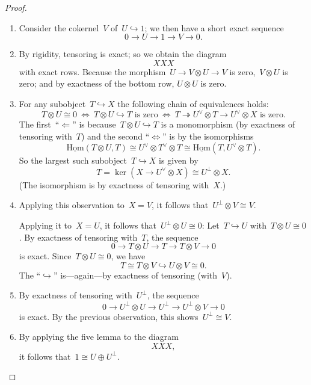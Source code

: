 \documentclass[a4paper,english,12pt]{scrartcl}
\theoremstyle{definition}
\theoremstyle{plain}
\theoremstyle{remark}
\renewcommand{\_}{\mathpunct{.}\,}
\newcommand{\?}{\,{:}\,}
\newcommand{\Hom}{\underline{\mathrm{Hom}}}
\begin{document}
\begin{proof}\begin{enumerate}
\item Consider the cokernel~$V$ of~$U \hookrightarrow 1$; we then have a short
exact sequence
\[ 0 \longrightarrow U \longrightarrow 1 \longrightarrow V \longrightarrow 0.
\]
\item By rigidity, tensoring is exact; so we obtain the diagram
\[ XXX \]
with exact rows. Because the morphism~$U \to V \otimes U \to V$ is zero,~$V
\otimes U$ is zero; and by exactness of the bottom row, $U \otimes U$ is zero.
\item For any subobject~$T \hookrightarrow X$ the following chain of
equivalences holds:
\[ T \otimes U \cong 0
  \ \Longleftrightarrow\ 
  \text{$T \otimes U \hookrightarrow T$ is zero}
  \ \Longleftrightarrow\ 
  \text{$T \twoheadrightarrow U^\vee \otimes T \to U^\vee \otimes X$ is zero}.
  \]
The first~``$\Leftarrow$'' is because~$T \otimes U \hookrightarrow T$ is a
monomorphism (by exactness of tensoring with~$T$) and the second
``$\Leftrightarrow$'' is by the isomorphisms
\[ \Hom(T \otimes U, T) \cong U^\vee \otimes T^\vee \otimes T \cong
  \Hom(T, U^\vee \otimes T). \]
So the largest such subobject~$T \hookrightarrow X$ is given by
\[ T = \ker(X \to U^\vee \otimes X) \cong U^\perp \otimes X. \]
(The isomorphism is by exactness of tensoring with~$X$.)
\item Applying this observation to~$X = V$, it follows that~$U^\perp \otimes V
\cong V$.

Applying it to~$X = U$, it follows that~$U^\perp \otimes U \cong 0$: Let~$T
\hookrightarrow U$ with~$T \otimes U \cong 0$. By exactness of tensoring
with~$T$, the sequence
\[ 0 \longrightarrow T \otimes U \longrightarrow T \longrightarrow T \otimes V
\longrightarrow 0 \]
is exact. Since~$T \otimes U \cong 0$, we have
\[ T \cong T \otimes V \hookrightarrow U \otimes V \cong 0. \]
The ``$\hookrightarrow$'' is---again---by exactness of tensoring (with~$V$).

\item By exactness of tensoring with~$U^\perp$, the sequence
\[ 0 \longrightarrow U^\perp \otimes U \longrightarrow U^\perp \longrightarrow
U^\perp \otimes V \longrightarrow 0 \]
is exact. By the previous observation, this shows~$U^\perp \cong V$.

\item By applying the five lemma to the diagram
\[ XXX, \]
it follows that~$1 \cong U \oplus U^\perp$. \qedhere
\end{enumerate}
\end{proof}
\end{document}
